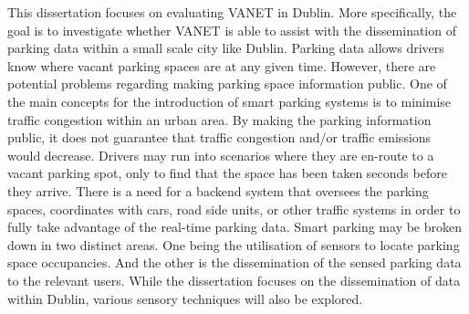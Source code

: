 This dissertation focuses on evaluating \ac{VANET} in Dublin. More specifically, the goal is to investigate whether \ac{VANET} is able to assist with the dissemination of parking data within a small scale city like Dublin. Parking data allows drivers know where vacant parking spaces are at any given time. However, there are potential problems regarding making parking space information public. One of the main concepts for the introduction of smart parking systems is to minimise traffic congestion within an urban area. By making the parking information public, it does not guarantee that traffic congestion and/or traffic emissions would decrease. Drivers may run into scenarios where they are en-route to a vacant parking spot, only to find that the space has been taken seconds before they arrive. There is a need for a backend system that oversees the parking spaces, coordinates with cars, road side units, or other traffic systems in order to fully take advantage of the real-time parking data. Smart parking may be broken down in two distinct areas. One being the utilisation of sensors to locate parking space occupancies. And the other is the dissemination of the sensed parking data to the relevant users. While the dissertation focuses on the dissemination of data within Dublin, various sensory techniques will also be explored.\\